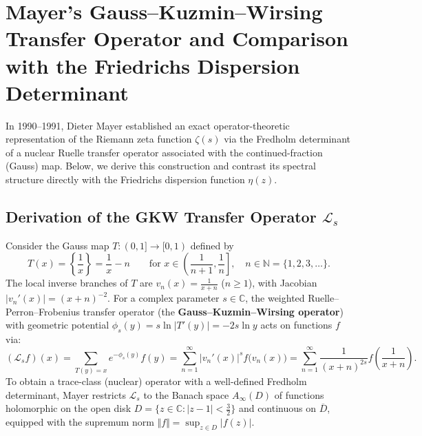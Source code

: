 \documentclass[11pt,a4paper]{article}
\begin{document}
\appendix

\section{Mayer's Gauss--Kuzmin--Wirsing Transfer Operator and Comparison with the Friedrichs Dispersion Determinant}\label{app:mayer}

In 1990--1991, Dieter Mayer \cite{Mayer1990,Mayer1991} established an exact operator-theoretic representation of the Riemann zeta function $\zeta(s)$ via the Fredholm determinant of a nuclear Ruelle transfer operator associated with the continued-fraction (Gauss) map. Below, we derive this construction and contrast its spectral structure directly with the Friedrichs dispersion function $\eta(z)$.

\subsection{Derivation of the GKW Transfer Operator $\mathcal{L}_s$}

Consider the Gauss map $T : (0,1] \to [0,1)$ defined by
\begin{equation}
T(x) = \left\{\frac{1}{x}\right\} = \frac{1}{x} - n \qquad \text{for } x \in \left(\frac{1}{n+1}, \frac{1}{n}\right], \quad n \in \mathbb{N} = \{1, 2, 3, \dots\}.
\end{equation}
The local inverse branches of $T$ are $v_n(x) = \frac{1}{x + n}$ ($n \ge 1$), with Jacobian $\lvert v_n'(x)\rvert = (x + n)^{-2}$. For a complex parameter $s \in \mathbb{C}$, the weighted Ruelle--Perron--Frobenius transfer operator (the \textbf{Gauss--Kuzmin--Wirsing operator}) with geometric potential $\phi_s(y) = s \ln \lvert T'(y)\rvert = -2s \ln y$ acts on functions $f$ via:
\begin{equation}\label{eq:gkw_def}
(\mathcal{L}_s f)(x) = \sum_{T(y)=x} e^{-\phi_s(y)} f(y) = \sum_{n=1}^{\infty} \lvert v_n'(x)\rvert^s f\big(v_n(x)\big) = \sum_{n=1}^{\infty} \frac{1}{(x+n)^{2s}} f\left(\frac{1}{x+n}\right).
\end{equation}
To obtain a trace-class (nuclear) operator with a well-defined Fredholm determinant, Mayer restricts $\mathcal{L}_s$ to the Banach space $A_\infty(D)$ of functions holomorphic on the open disk $D = \{z \in \mathbb{C} : \lvert z - 1\rvert < \frac{3}{2}\}$ and continuous on $\overline{D}$, equipped with the supremum norm $\Vert f\Vert = \sup_{z \in D} \lvert f(z)\rvert$.
\end{document}
